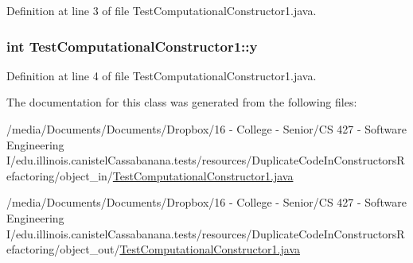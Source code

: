 Definition at line 3 of file TestComputationalConstructor1.java.

\hypertarget{classTestComputationalConstructor1_a3ee7eb42c5bcb713e70e98c2fff0c44d}{
\subsubsection[{y}]{\setlength{\rightskip}{0pt plus 5cm}int {\bf TestComputationalConstructor1::y}}}
\label{classTestComputationalConstructor1_a3ee7eb42c5bcb713e70e98c2fff0c44d}


Definition at line 4 of file TestComputationalConstructor1.java.



The documentation for this class was generated from the following files:\begin{DoxyCompactItemize}
\item 
/media/Documents/Documents/Dropbox/16 -\/ College -\/ Senior/CS 427 -\/ Software Engineering I/edu.illinois.canistelCassabanana.tests/resources/DuplicateCodeInConstructorsRefactoring/object\_\-in/\hyperlink{object__in_2TestComputationalConstructor1_8java}{TestComputationalConstructor1.java}\item 
/media/Documents/Documents/Dropbox/16 -\/ College -\/ Senior/CS 427 -\/ Software Engineering I/edu.illinois.canistelCassabanana.tests/resources/DuplicateCodeInConstructorsRefactoring/object\_\-out/\hyperlink{object__out_2TestComputationalConstructor1_8java}{TestComputationalConstructor1.java}\end{DoxyCompactItemize}
